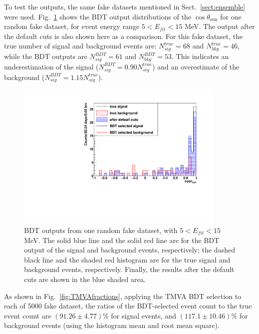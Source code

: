 To test the outputs, the same fake datasets mentioned in Sect.~\ref{sect:ensemble} were used. Fig.~\ref{fig:BDToutputs} shows the BDT output distributions of the $\cos\theta_\mathrm{sun}$ for one random fake dataset, for event energy range $5<E_{fit}<15$ MeV. The output after the default cuts is also shown here as a comparison. For this fake dataset, the true number of signal and background events are: $N^{true}_{sig}=68$ and $N^{true}_{bkg}=46$, while the BDT outputs are $N^{BDT}_{sig}=61$ and $N^{BDT}_{bkg}=53$. This indicates an underestimation of the signal ($N^{BDT}_{sig}=0.90 N^{true}_{sig}$) and an overestimate of the background ($N^{BDT}_{sig}=1.15 N^{true}_{sig}$). 

\begin{figure}[!htb]
	\centering
	\includegraphics[width=10cm]{tmvaHalfFakeData_output.pdf}
	\caption[BDT outputs from one random fake dataset, with $5<E_{fit}<15$ MeV.]{BDT outputs from one random fake dataset, with $5<E_{fit}<15$ MeV. The solid blue line and the solid red line are for the BDT output of the signal and background events, respectively; the dashed black line and the shaded red histogram are for the true signal and background events, respectively. Finally, the results after the default cuts are shown in the blue shaded area.\label{fig:BDToutputs}}
\end{figure}

As shown in Fig.~\ref{fig:TMVAfractions}, applying the TMVA BDT selection to each of 5000 fake dataset, the ratios of the BDT-selected event count to the true event count are $(91.26\pm 4.77)\%$ for signal events, and $(117.1\pm 10.46)\%$ for background events (using the histogram mean and root mean square). 


